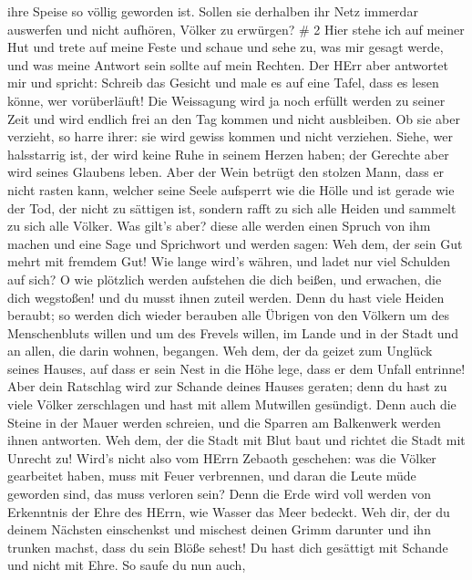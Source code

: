 ihre Speise so völlig geworden ist.  Sollen sie derhalben
ihr Netz immerdar auswerfen und nicht aufhören, Völker zu erwürgen? \# 2
 Hier stehe ich auf meiner Hut und trete auf meine Feste und
schaue und sehe zu, was mir gesagt werde, und was meine Antwort sein
sollte auf mein Rechten.  Der HErr aber antwortet mir und
spricht: Schreib das Gesicht und male es auf eine Tafel, dass es lesen
könne, wer vorüberläuft!  Die Weissagung wird ja noch
erfüllt werden zu seiner Zeit und wird endlich frei an den Tag kommen
und nicht ausbleiben. Ob sie aber verzieht, so harre ihrer: sie wird
gewiss kommen und nicht verziehen.  Siehe, wer halsstarrig
ist, der wird keine Ruhe in seinem Herzen haben; der Gerechte aber wird
seines Glaubens leben.  Aber der Wein betrügt den stolzen
Mann, dass er nicht rasten kann, welcher seine Seele aufsperrt wie die
Hölle und ist gerade wie der Tod, der nicht zu sättigen ist, sondern
rafft zu sich alle Heiden und sammelt zu sich alle Völker. 
Was gilt's aber? diese alle werden einen Spruch von ihm machen und eine
Sage und Sprichwort und werden sagen: Weh dem, der sein Gut mehrt mit
fremdem Gut! Wie lange wird's währen, und ladet nur viel Schulden auf
sich?  O wie plötzlich werden aufstehen die dich beißen, und
erwachen, die dich wegstoßen! und du musst ihnen zuteil werden.
 Denn du hast viele Heiden beraubt; so werden dich wieder
berauben alle Übrigen von den Völkern um des Menschenbluts willen und um
des Frevels willen, im Lande und in der Stadt und an allen, die darin
wohnen, begangen.  Weh dem, der da geizet zum Unglück seines
Hauses, auf dass er sein Nest in die Höhe lege, dass er dem Unfall
entrinne!  Aber dein Ratschlag wird zur Schande deines
Hauses geraten; denn du hast zu viele Völker zerschlagen und hast mit
allem Mutwillen gesündigt.  Denn auch die Steine in der
Mauer werden schreien, und die Sparren am Balkenwerk werden ihnen
antworten.  Weh dem, der die Stadt mit Blut baut und
richtet die Stadt mit Unrecht zu!  Wird's nicht also vom
HErrn Zebaoth geschehen: was die Völker gearbeitet haben, muss mit Feuer
verbrennen, und daran die Leute müde geworden sind, das muss verloren
sein?  Denn die Erde wird voll werden von Erkenntnis der
Ehre des HErrn, wie Wasser das Meer bedeckt.  Weh dir, der
du deinem Nächsten einschenkst und mischest deinen Grimm darunter und
ihn trunken machst, dass du sein Blöße sehest!  Du hast
dich gesättigt mit Schande und nicht mit Ehre. So saufe du nun auch,
